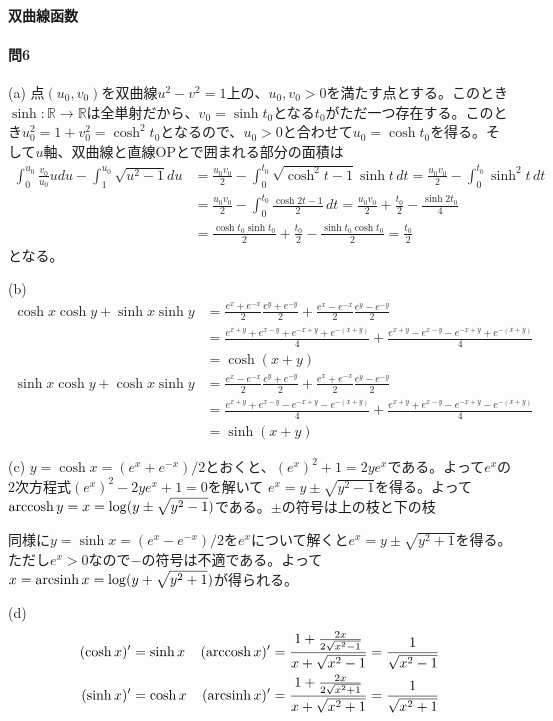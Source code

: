 \paragraph{双曲線函数}

\paragraph{問6}
(a) 点$(u_0,v_0)$を双曲線$u^2-v^2=1$上の、$u_0,v_0>0$を満たす点とする。このとき$\sinh\colon\mathbb{R}\rightarrow\mathbb{R}$は全単射だから、$v_0=\sinh t_0$となる$t_0$がただ一つ存在する。このとき$u_0^2=1+v_0^2=\cosh^2 t_0$となるので、$u_0>0$と合わせて$u_0=\cosh t_0$を得る。そして$u$軸、双曲線と直線$\mathrm{OP}$とで囲まれる部分の面積は
\begin{align*}
\int_0^{u_0} \frac{v_0}{u_0}u du - \int_1^{u_0} \sqrt{u^2-1} du
&= \frac{u_0v_0}{2} - \int_0^{t_0} \sqrt{\cosh^2 t -1} \sinh t \,dt 
= \frac{u_0v_0}{2} - \int_0^{t_0} \sinh^2 t \,dt  \\
&= \frac{u_0v_0}{2} - \int_0^{t_0} \frac{\cosh 2t - 1}{2} \,dt
= \frac{u_0v_0}{2} + \frac{t_0}{2} - \frac{\sinh 2t_0}{4} \\
&= \frac{\cosh t_0 \sinh t_0}{2} + \frac{t_0}{2} - \frac{\sinh t_0 \cosh t_0}{2} = \frac{t_0}{2}
\end{align*}
となる。

(b)
\begin{align*}
\cosh x \cosh y + \sinh x \sinh y
&= \frac{e^x + e^{-x}}{2} \frac{e^y + e^{-y}}{2} + \frac{e^x - e^{-x}}{2}\frac{e^y - e^{-y}}{2} \\
&= \frac{e^{x+y} + e^{x-y} + e^{-x+y} + e^{-(x+y)}}{4} + \frac{e^{x+y} - e^{x-y} - e^{-x+y} + e^{-(x+y)}}{4} \\
&= \cosh(x+y) \\
\sinh x \cosh y + \cosh x \sinh y
&= \frac{e^x - e^{-x}}{2} \frac{e^y + e^{-y}}{2} + \frac{e^x + e^{-x}}{2}\frac{e^y - e^{-y}}{2} \\
&= \frac{e^{x+y} + e^{x-y} - e^{-x+y} - e^{-(x+y)}}{4} + \frac{e^{x+y} + e^{x-y} - e^{-x+y} - e^{-(x+y)}}{4} \\
&= \sinh(x+y)
\end{align*}

\noindent (c) 
$y=\cosh x = (e^x+e^{-x})/2$とおくと、$(e^x)^2 + 1 = 2ye^x$である。よって$e^x$の$2$次方程式$(e^x)^2 - 2y e^x+1=0$を解いて
$e^x = y\pm\sqrt{y^2-1}$を得る。よって$\operatorname{arccosh} y = x = \log(y\pm\sqrt{y^2-1})$である。$\pm$の符号は上の枝と下の枝

同様に$y=\sinh x = (e^x - e^{-x})/2$を$e^x$について解くと$e^x=y\pm\sqrt{y^2+1}$を得る。ただし$e^x>0$なので$-$の符号は不適である。よって$x=\operatorname{arcsinh} x=\log(y+\sqrt{y^2+1})$が得られる。

\noindent (d)
\begin{align*}
(\cosh x)' &= \sinh x & 
(\operatorname{arccosh} x)' &= \frac{1+\frac{2x}{2\sqrt{x^2-1}}}{x+\sqrt{x^2-1}} = \frac{1}{\sqrt{x^2-1}} \\
(\sinh x)' &= \cosh x &
(\operatorname{arcsinh} x)' &= \frac{1+\frac{2x}{2\sqrt{x^2+1}}}{x+\sqrt{x^2+1}} = \frac{1}{\sqrt{x^2+1}}
\end{align*}
